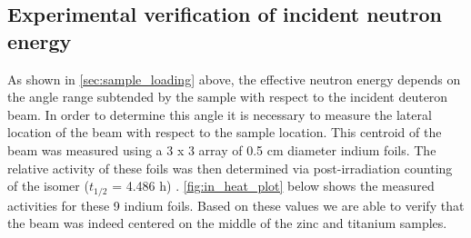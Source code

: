\documentclass[5p]{elsarticle}
\begin{document}



\subsection{Experimental verification of incident neutron energy}\label{sec:lee_sec}

As shown in \autoref{sec:sample_loading} above, the effective neutron energy depends on the angle range subtended by the sample with respect to the incident deuteron beam.  In order to determine this angle it is necessary to measure the lateral location of the beam with respect to the sample location.  This centroid of the beam was measured using a 3 x 3 array of 0.5 cm diameter indium foils.  The relative activity of these foils was then determined via post-irradiation counting of the  isomer ($t_{1/2}$ = 4.486 h) \cite{Blachot2012}.  \autoref{fig:in_heat_plot} below shows the measured activities for these 9 indium foils.  Based on these values we are able to verify that the beam was indeed centered on the middle of the zinc and titanium samples.   
\end{document}
